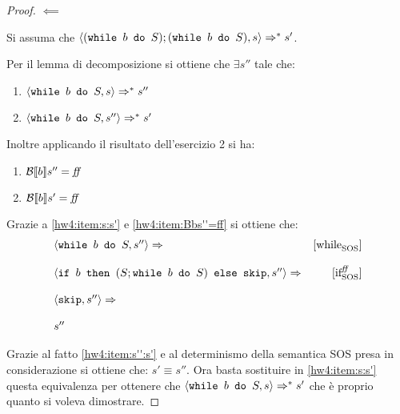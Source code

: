 {\begin{proof}
$\boxed{\impliedby}$

Si assuma che $\confSs{(\wbS{b}{S}); (\wbS{b}{S})}{s} \Rar{*} s'$.


Per il lemma di decomposizione si ottiene che $\exists s''$ tale che:
\begin{enumerate}[label=(\Roman*)]
	\item $\confSs{\wbS{b}{S}}{s} \Rar{*} s''$
	\label{hw4:item:s:s'}
	\item $\confSs{\wbS{b}{S}}{s''} \Rar{*} s'$
	\label{hw4:item:s'':s'}
\end{enumerate}
Inoltre applicando il risultato dell'esercizio 2 si ha:
\begin{enumerate}[label=(\alph*)]
	\item $\B{b}'' = \semfalse$
	\label{hw4:item:Bbs''=ff}
	\item $\B{b}' = \semfalse$
	
\end{enumerate}
Grazie a \ref{hw4:item:s:s'} e \ref{hw4:item:Bbs''=ff} si ottiene che:
$$
\begin{array}{lr}
\confSs{\wbS{b}{S}}{s''} \Rar{}& \whileSOS\\
& \\
\confSs{\ifABC{b}{(S; \wbS{b}{S})}{\skipForFriends}}{s''} \Rar{}& \ifffSOS \\
 & \\
\confSs{\skipForFriends}{s''} \Rar{}& \\
& \\
s''
\end{array}
$$


Grazie al fatto \ref{hw4:item:s'':s'} e al determinismo della semantica SOS
presa in considerazione si ottiene che: $s' \equiv{ } s''$.
Ora basta sostituire in \ref{hw4:item:s:s'} questa equivalenza per ottenere
che $\confSs{\wbS{b}{S}}{s} \Rar{*} s'$ che è proprio quanto si voleva
dimostrare.
\end{proof}
}
